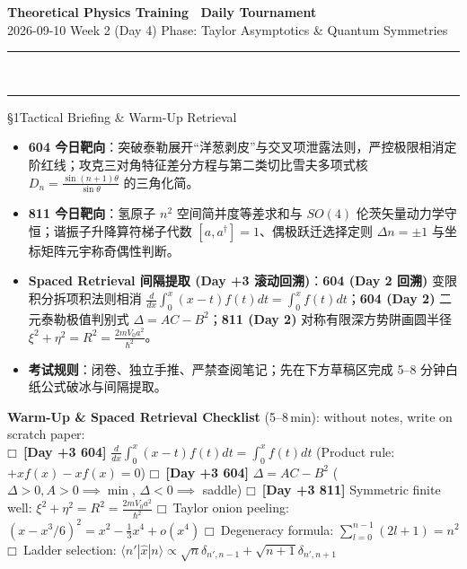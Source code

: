 \documentclass[a4paper,11pt]{article}
\newcommand{\checkbox}{\ensuremath{\mdlgwhtsquare}}
\newcommand{\alerttag}[1]{\textcolor{wine}{\sffamily\bfseries [#1]}}
\begin{document}
\clearpage

\begin{center}
  {\LARGE\bfseries\color{navy} Theoretical Physics Training \textperiodcentered\ Daily Tournament}\\[3pt]
  {\small\sffamily\color{mist} 2026-09-10 \quad\textbar\quad Week 2 (Day 4) \quad\textbar\quad Phase: Taylor Asymptotics \& Quantum Symmetries}\\[-4pt]
  {\color{navy}\rule{\textwidth}{0.8pt}}\\[-11pt]
  {\color{border}\rule{\textwidth}{0.3pt}}
\end{center}

\vspace{-6pt}

\begin{briefing}{\S 1\quad Tactical Briefing \& Warm-Up Retrieval}
\begin{itemize}[leftmargin=1.5em, itemsep=2pt, topsep=1pt]
  \item \textbf{604 今日靶向}：突破泰勒展开“洋葱剥皮”与交叉项泄露法则，严控极限相消定阶红线；攻克三对角特征差分方程与第二类切比雪夫多项式核 $D_n = \frac{\sin(n+1)\theta}{\sin\theta}$ 的三角化简。
  \item \textbf{811 今日靶向}：氢原子 $n^2$ 空间简并度等差求和与 $SO(4)$ 伦茨矢量动力学守恒；谐振子升降算符梯子代数 $[a, a^\dagger]=1$、偶极跃迁选择定则 $\Delta n = \pm 1$ 与坐标矩阵元宇称奇偶性判断。
  \item \textbf{Spaced Retrieval 间隔提取 (Day +3 滚动回溯)}：\textbf{604 (Day 2 回溯)} 变限积分拆项积法则相消 $\frac{d}{dx}\int_0^x (x-t)f(t)dt = \int_0^x f(t)dt$；\textbf{604 (Day 2)} 二元泰勒极值判别式 $\Delta = AC - B^2$；\textbf{811 (Day 2)} 对称有限深方势阱画圆半径 $\xi^2+\eta^2 = R^2 = \frac{2mV_0 a^2}{\hbar^2}$。
  \item \textbf{考试规则}：闭卷、独立手推、严禁查阅笔记；先在下方草稿区完成 5--8 分钟白纸公式破冰与间隔提取。
\end{itemize}

\vspace{1mm}
\textbf{Warm-Up \& Spaced Retrieval Checklist} (5--8\,min): without notes, write on scratch paper:\\
\checkbox\ \alerttag{Day +3 604} $\frac{d}{dx}\int_0^x (x-t)f(t)dt = \int_0^x f(t)dt$ (Product rule: $+xf(x) - xf(x) = 0$)\quad
\checkbox\ \alerttag{Day +3 604} $\Delta = AC - B^2$ ($\Delta>0, A>0 \implies \min$, $\Delta<0 \implies$ saddle) \quad
\checkbox\ \alerttag{Day +3 811} Symmetric finite well: $\xi^2+\eta^2 = R^2 = \frac{2mV_0 a^2}{\hbar^2}$ \quad
\checkbox\ Taylor onion peeling: $(x - x^3/6)^2 = x^2 - \frac{1}{3}x^4 + o(x^4)$ \quad
\checkbox\ Degeneracy formula: $\sum_{l=0}^{n-1} (2l+1) = n^2$ \quad
\checkbox\ Ladder selection: $\langle n'|\hat{x}|n\rangle \propto \sqrt{n}\delta_{n', n-1} + \sqrt{n+1}\delta_{n', n+1}$
\end{briefing}
\end{document}
